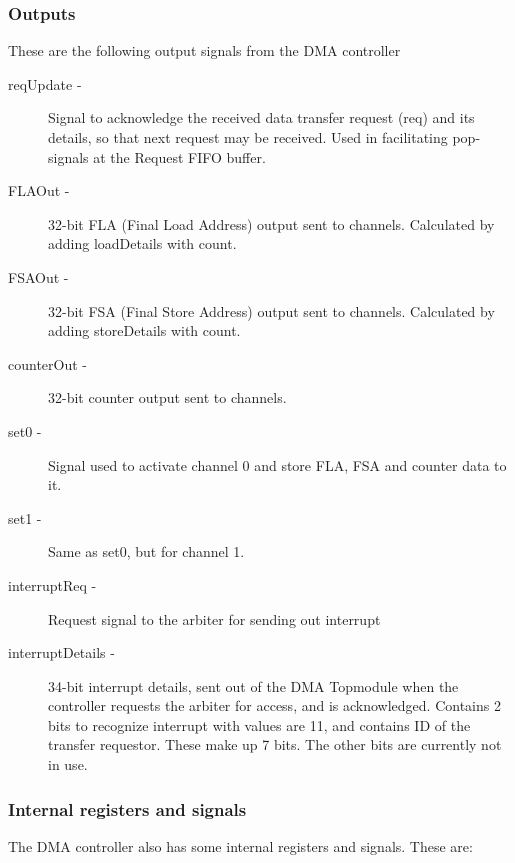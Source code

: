 \begin{appendix}
\subsubsection{Outputs}
These are the following output signals from the DMA controller

\begin{description}
    \item [reqUpdate -]
    Signal to acknowledge the received data transfer request (req) and its details, so that next request may be received.
    Used in facilitating pop-signals at the Request FIFO buffer.
    \item[FLAOut -]
    32-bit FLA (Final Load Address) output sent to channels.
    Calculated by adding loadDetails with count.
    \item[FSAOut -]
    32-bit FSA (Final Store Address) output sent to channels.
    Calculated by adding storeDetails with count.
    \item[counterOut -]
    32-bit counter output sent to channels.
    \item[set0 -]
    Signal used to activate channel 0 and store FLA, FSA and counter data to it.
    \item[set1 -]
    Same as set0, but for channel 1.
    \item[interruptReq -]
    Request signal to the arbiter for sending out interrupt
    \item[interruptDetails -]
    34-bit interrupt details, sent out of the DMA Topmodule when the controller requests the arbiter for access, and is acknowledged.
    Contains 2 bits to recognize interrupt with values are 11, and contains ID of the transfer requestor. 
    These make up 7 bits. 
    The other bits are currently not in use.
\end{description}

\subsubsection{Internal registers and signals}
The DMA controller also has some internal registers and signals.
These are:


\end{appendix}
